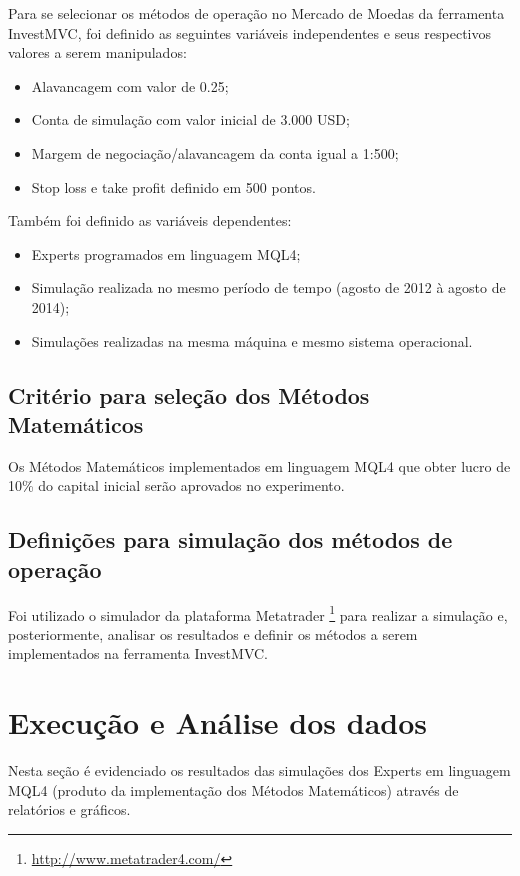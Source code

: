 Para se selecionar os métodos de operação no Mercado de Moedas da ferramenta InvestMVC, foi definido as seguintes variáveis independentes e seus respectivos valores a serem manipulados:

\begin{itemize}
\item Alavancagem com valor de 0.25;
\item Conta de simulação com valor inicial de 3.000 USD;
\item Margem de negociação/alavancagem da conta igual a 1:500;
\item Stop loss e take profit definido em 500 pontos.
\end{itemize}

Também foi definido as variáveis dependentes:

\begin{itemize}
\item Experts programados em linguagem MQL4;
\item Simulação realizada no mesmo período de tempo (agosto de 2012 à agosto de 2014);
\item Simulações realizadas na mesma máquina e mesmo sistema operacional.

\end{itemize}

\subsection{Critério para seleção dos Métodos Matemáticos}

Os Métodos Matemáticos implementados em linguagem MQL4 que obter lucro de 10\% do capital inicial serão aprovados no experimento.

\subsection{Definições para simulação dos métodos de operação}

Foi utilizado o simulador da plataforma Metatrader \footnote{\url{http://www.metatrader4.com/}} para realizar a simulação e, posteriormente, analisar os resultados e definir os métodos a serem implementados na ferramenta InvestMVC.

\section{Execução e Análise dos dados}

Nesta seção é evidenciado os resultados  das simulações dos Experts em linguagem MQL4 (produto da implementação dos Métodos Matemáticos) através de relatórios e gráficos.

